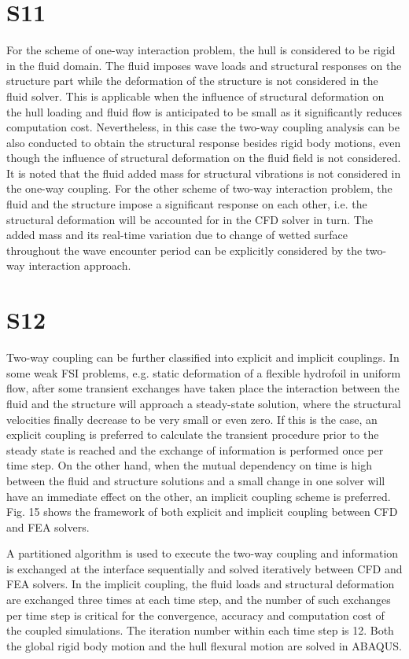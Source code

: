 \documentclass[17pt]{extarticle} %
\begin{document}
\section*{S11}
For the scheme of one-way interaction problem, the hull is considered to be rigid in the fluid domain. The fluid imposes wave loads and structural responses 
on the structure part while the deformation of the structure is not considered in the fluid solver. This is applicable when the influence of structural 
deformation on the hull loading and fluid flow is anticipated to be small as it significantly reduces computation cost. Nevertheless, in this case the 
two-way coupling analysis can be also conducted to obtain the structural response besides rigid body motions, even though the influence of structural 
deformation on the fluid field is not considered. It is noted that the fluid added mass for structural vibrations is not considered in the one-way coupling. 
For the other scheme of two-way interaction problem, the fluid and the structure impose a significant response on each other, i.e. the structural deformation 
will be accounted for in the CFD solver in turn. The added mass and its real-time variation due to change of wetted surface throughout the wave encounter period 
can be explicitly considered by the two-way interaction approach.

\section*{S12}
Two-way coupling can be further classified into explicit and implicit couplings. In some weak FSI problems, e.g. 
static deformation of a flexible hydrofoil in uniform flow, after some transient exchanges have taken place the 
interaction between the fluid and the structure will approach a steady-state solution, where the structural velocities
finally decrease to be very small or even zero. If this is the case, an explicit coupling is preferred to calculate the 
transient procedure prior to the steady state is reached and the exchange of information is performed once per time step. 
On the other hand, when the mutual dependency on time is high between the fluid and structure solutions and a small change 
in one solver will have an immediate effect on the other, an implicit coupling scheme is preferred. Fig. 15 shows the framework of 
both explicit and implicit coupling between CFD and FEA solvers.

A partitioned algorithm is used to execute the two-way coupling and information is exchanged at the interface sequentially and 
solved iteratively between CFD and FEA solvers. In the implicit coupling, the fluid loads and structural deformation are exchanged 
three times at each time step, and the number of such exchanges per time step is critical for the convergence, accuracy and computation 
cost of the coupled simulations. The iteration number within each time step is 12. Both the global rigid body motion and the hull flexural 
motion are solved in ABAQUS.
\end{document}
